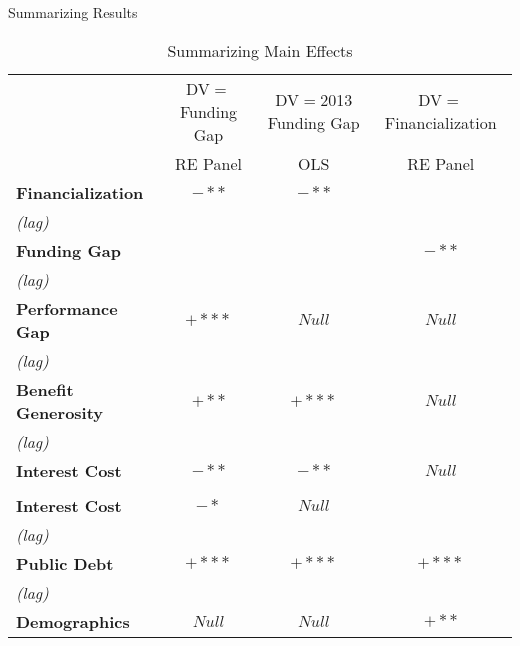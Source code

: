 \documentclass{beamer}
\begin{document}
\begin{frame}{\textmd{Summarizing Results}}
\begin{table}
\begin{tiny}
\begin{center}
\caption*{Summarizing Main Effects} 
\begin{tabular}{l c c c}
\hline 
 & DV$=$Funding Gap & DV$=$2013 Funding Gap & DV$=$Financialization \\
 & RE Panel & OLS & RE Panel \\
 \hline
\textbf{Financialization}    		  & \scriptsize{\color{red}\textbf{$-**$}} & \scriptsize{\color{red}\textbf{$-**$}}\\
\hspace*{0.25cm} \emph{(lag)} &  & \\[0.4ex]
\textbf{Funding Gap} 		&		  & 			& \scriptsize{\color{red}\textbf{$-**$}} \\
\hspace*{0.25cm} \emph{(lag)} &  			&     \\[0.4ex]
\textbf{Performance Gap}    & \scriptsize{\color{teal}\textbf{$+***$}} & \color{gray}$Null$  & \color{gray}$Null$     \\
\hspace*{0.25cm} \emph{(lag)} &  &  \\[0.4ex]
\textbf{Benefit Generosity}    & \scriptsize{\color{teal}\textbf{$+**$}}   &  \scriptsize{\color{teal}\textbf{$+***$}} & \color{gray}$Null$ 	\\
\hspace*{0.25cm} \emph{(lag)} &   &   \\[0.4ex]
\textbf{Interest Cost}            & \scriptsize{\color{red}\textbf{$-**$}}  & \scriptsize{\color{red}\textbf{$-**$}} &  \color{gray}$Null$ \\
                    &  &  \\[0.4ex]
\textbf{Interest Cost}    & \scriptsize{\color{red}\textbf{$-*$}}    &   \color{gray}$Null$       \\
\hspace*{0.25cm} \emph{(lag)} & &   \\[0.4ex]
\textbf{Public Debt}     & \scriptsize{\color{teal}\textbf{$+***$}} & \scriptsize{\color{teal}\textbf{$+***$}}  &   \scriptsize{\color{teal}\textbf{$+***$}} \\
\hspace*{0.25cm} \emph{(lag)} &   &   \\[0.4ex]
\textbf{Demographics} & \color{gray}$Null$ & \color{gray}$Null$ & \scriptsize{\color{teal}\textbf{$+**$}}   \\

\end{tabular}
\end{center}
\end{tiny}
\end{table}
\end{frame}
\end{document}
